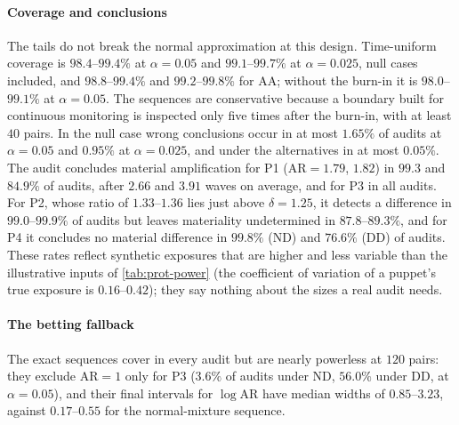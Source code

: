 \paragraph{Coverage and conclusions} The tails do not break the normal approximation at this design. Time-uniform coverage is $98.4$--$99.4\%$ at $\alpha=0.05$ and $99.1$--$99.7\%$ at $\alpha=0.025$, null cases included, and $98.8$--$99.4\%$ and $99.2$--$99.8\%$ for $\mathrm{AA}$; without the burn-in it is $98.0$--$99.1\%$ at $\alpha=0.05$. The sequences are conservative because a boundary built for continuous monitoring is inspected only five times after the burn-in, with at least $40$ pairs. In the null case wrong conclusions occur in at most $1.65\%$ of audits at $\alpha=0.05$ and $0.95\%$ at $\alpha=0.025$, and under the alternatives in at most $0.05\%$. The audit concludes material amplification for P1 ($\mathrm{AR}=1.79$, $1.82$) in $99.3$ and $84.9\%$ of audits, after $2.66$ and $3.91$ waves on average, and for P3 in all audits. For P2, whose ratio of $1.33$--$1.36$ lies just above $\delta=1.25$, it detects a difference in $99.0$--$99.9\%$ of audits but leaves materiality undetermined in $87.8$--$89.3\%$, and for P4 it concludes no material difference in $99.8\%$ (ND) and $76.6\%$ (DD) of audits. These rates reflect synthetic exposures that are higher and less variable than the illustrative inputs of \cref{tab:prot-power} (the coefficient of variation of a puppet's true exposure is $0.16$--$0.42$); they say nothing about the sizes a real audit needs.

\paragraph{The betting fallback} The exact sequences cover in every audit but are nearly powerless at $120$ pairs: they exclude $\mathrm{AR}=1$ only for P3 ($3.6\%$ of audits under ND, $56.0\%$ under DD, at $\alpha=0.05$), and their final intervals for $\log\mathrm{AR}$ have median widths of $0.85$--$3.23$, against $0.17$--$0.55$ for the normal-mixture sequence.

